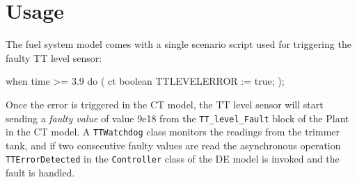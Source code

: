 
\section{Usage}

The fuel system model comes with a single scenario script used for
triggering the faulty TT level sensor:

\begin{dcl}[caption=DCL script activating the faulty trimmer tank level sensor.,label=list:dcl]
when time >= 3.9 do ( ct boolean TTLEVELERROR := true; );
\end{dcl}

Once the error is triggered in the CT model, the TT level sensor will
start sending a \emph{faulty value} of value 9e18 from the
\texttt{TT\_level\_Fault} block of the Plant in the CT model. A
\texttt{TTWatchdog} class monitors the readings from the trimmer tank,
and if two consecutive faulty values are read the asynchronous
operation \texttt{TTErrorDetected} in the \texttt{Controller} class of
the DE model is invoked and the fault is handled.

%



